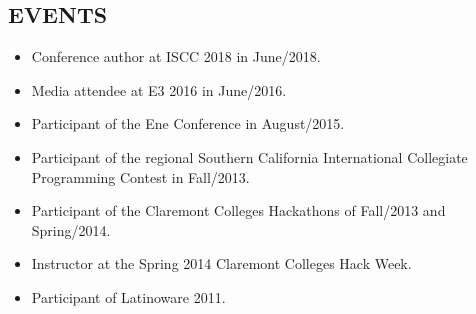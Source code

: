 \documentclass[margin]{res}
\begin{document}
\begin{resume}

			
		
		\section{EVENTS}
			\begin{itemize}
				\item[] Conference author at ISCC 2018 in June/2018.
				\item[] Media attendee at E3 2016 in June/2016.
				\item[] Participant of the Ene Conference in August/2015.
				\item[] Participant of the regional Southern California International Collegiate Programming Contest in Fall/2013.
				\item[] Participant of the Claremont Colleges Hackathons of Fall/2013 and Spring/2014.
				\item[] Instructor at the Spring 2014 Claremont Colleges Hack Week.
				\item[] Participant of Latinoware 2011.
			\end{itemize}


\end{resume}
\end{document}
